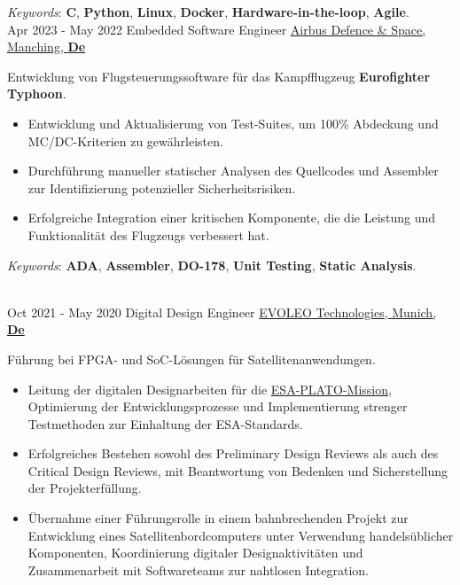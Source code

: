 \documentclass[letterpaper]{twentysecondcv} %
\begin{document}
\begin{twenty}
{            \vspace{1 mm}
            \textit{Keywords}: \textbf{C}, \textbf{Python}, \textbf{Linux}, \textbf{Docker}, \textbf{Hardware-in-the-loop}, \textbf{Agile}.
        }\\
    \twentyitem
        {Apr 2023 -}
        {May 2022}
        {Embedded Software Engineer}
        {\href{https://www.airbus.com/en/who-we-are}{Airbus Defence \& Space, Manching, \textbf{De}}}
        {}
        {
            Entwicklung von Flugsteuerungssoftware für das Kampfflugzeug \textbf{Eurofighter Typhoon}.
            \vspace{1 mm}
            \begin{itemize}
                \item Entwicklung und Aktualisierung von Test-Suites, um 100\% Abdeckung und MC/DC-Kriterien zu gewährleisten.
                \item Durchführung manueller statischer Analysen des Quellcodes und Assembler zur Identifizierung potenzieller Sicherheitsrisiken.
                \item Erfolgreiche Integration einer kritischen Komponente, die die Leistung und Funktionalität des Flugzeugs verbessert hat.
            \end{itemize}

            \vspace{1 mm}
            \textit{Keywords}: \textbf{ADA}, \textbf{Assembler}, \textbf{DO-178}, \textbf{Unit Testing}, \textbf{Static Analysis}.
        }\\
    \twentyitem
        {Oct 2021 -}
    	{May 2020}
        {Digital Design Engineer}
        {\href{http://evoleotech.com/company/}{EVOLEO Technologies, Munich, \textbf{De}}}
        {}
        {
            Führung bei FPGA- und SoC-Lösungen für Satellitenanwendungen.
            \vspace{1 mm}
            \begin{itemize}
                \item Leitung der digitalen Designarbeiten für die \href{https://sci.esa.int/web/plato}{ESA-PLATO-Mission}, Optimierung der Entwicklungsprozesse und Implementierung strenger Testmethoden zur Einhaltung der ESA-Standards.
                \item Erfolgreiches Bestehen sowohl des Preliminary Design Reviews als auch des Critical Design Reviews, mit Beantwortung von Bedenken und Sicherstellung der Projekterfüllung.
                \item Übernahme einer Führungsrolle in einem bahnbrechenden Projekt zur Entwicklung eines Satellitenbordcomputers unter Verwendung handelsüblicher Komponenten, Koordinierung digitaler Designaktivitäten und Zusammenarbeit mit Softwareteams zur nahtlosen Integration.
            \end{itemize}

}
\end{twenty}
\end{document}
